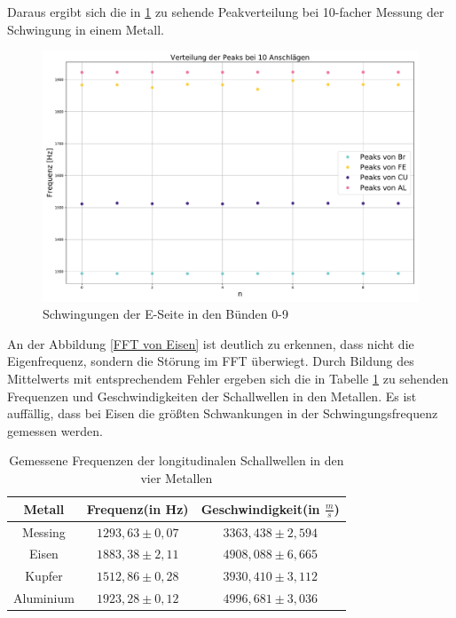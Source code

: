 \documentclass[a4paper, 11pt]{article}
\begin{document}
\noindent Daraus ergibt sich die in \ref{fig:Peaks} zu sehende Peakverteilung bei 10-facher Messung der Schwingung in einem Metall.

\begin{figure}[H]
	\centering
	\includegraphics[scale=0.4]{../Plots/Peakverteilung.pdf}
	\caption{Schwingungen der E-Seite in den Bünden 0-9}
	\label{fig:Peaks}
\end{figure}

\noindent An der Abbildung \ref{FFT von Eisen} ist deutlich zu erkennen, dass nicht die Eigenfrequenz, sondern die Störung im FFT überwiegt. Durch Bildung des Mittelwerts mit entsprechendem Fehler ergeben sich die in Tabelle \ref{table:Peaks} zu sehenden Frequenzen und Geschwindigkeiten der Schallwellen in den Metallen. Es ist auffällig, dass bei Eisen die größten Schwankungen in der Schwingungsfrequenz gemessen werden.

\begin{table}[H]
\centering
\renewcommand{\arraystretch}{1.2}
\begin{tabular}{|c|c|c|}
\hline Metall & Frequenz(in Hz) & Geschwindigkeit(in $\frac{m}{s}$) \\
\hline Messing & $1293,63 \pm 0,07$ & $3363,438 \pm 2,594$ \\
Eisen & $1883,38 \pm 2,11$ & $4908,088 \pm 6,665$ \\
Kupfer & $1512,86 \pm 0,28$ & $3930,410 \pm 3,112$ \\
Aluminium & $1923,28 \pm 0,12$ & $4996,681 \pm 3,036$ \\
\hline
\end{tabular}
\caption{Gemessene Frequenzen der longitudinalen Schallwellen in den vier Metallen}
\label{table:Peaks}
\end{table}
\end{document}
